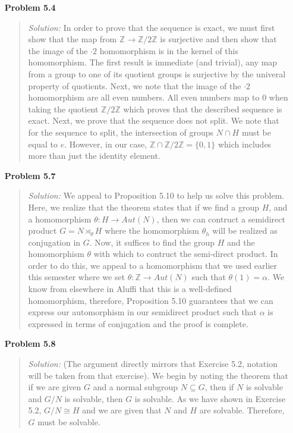 \documentclass{article}
\newcommand{\Solution}{\textit{Solution: }}
\begin{document}
\begin{enumerate}
\begin{quote}
            \qedsymbol
        \end{quote} 
        \item[\textbf{Problem 5.4}]
        \begin{quote}
            \Solution In order to prove that the sequence is exact, we must first show that the map from $\mathbb{Z} \to \mathbb{Z}/2\mathbb{Z}$ is surjective and then show that the 
            image of the $\cdot 2$ homomorphism is in the kernel of this homomorphism. The first result is immediate (and trivial), any map from a group to one of its quotient groups is surjective 
            by the univeral property of quotients. Next, we note that the image of the $\cdot 2$ homomorphism are all even numbers. All even numbers map to $0$ when taking the quotient 
            $\mathbb{Z}/2\mathbb{Z}$ which proves that the described sequence is exact. Next, we prove that the sequence does not split. We note that for the sequence to split, the intersection of 
            groups $N \cap H$ must be equal to $e$. However, in our case, $\mathbb{Z} \cap \mathbb{Z}/2\mathbb{Z} = \{0, 1\}$ which includes more than just the identity element. \qedsymbol
        \end{quote} 
        \item[\textbf{Problem 5.7}]
        \begin{quote}
            \Solution We appeal to Proposition 5.10 to help us solve this problem. Here, we realize that the theorem states that if we find a group $H$, and a homomorphism $\theta:H \to Aut(N)$, then
            we can contruct a semidirect product $G = N \rtimes_\theta H$ where the homomorphism $\theta_h$ will be realized as conjugation in $G$. Now, it suffices to find the group $H$ and the homomorphism
            $\theta$ with which to contruct the semi-direct product. In order to do this, we appeal to a homomorphism that we used earlier this semester where we set $\theta: \mathbb{Z} \to Aut(N)$ such that 
            $\theta(1) = \alpha$. We know from elsewhere in Aluffi that this is a well-defined homomorphism, therefore, Proposition 5.10 guarantees that we can express our automorphism in our semidirect product
            such that $\alpha$ is expressed in terms of conjugation and the proof is complete. \qedsymbol
        \end{quote}
        \item[\textbf{Problem 5.8}]
        \begin{quote}
            \Solution (The argument directly mirrors that Exercise 5.2, notation will be taken from that exercise).
            We begin by noting the theorem that if we are given $G$ and a normal subgroup $N \subseteq G$, then if $N$ is solvable and $G/N$ is solvable,
            then $G$ is solvable. As we have shown in Exercise 5.2, $G/N \cong H$ and we are given that $N$ and $H$ are solvable. Therefore, $G$ must be solvable. 
            

\end{quote}
\end{enumerate}
\end{document}
